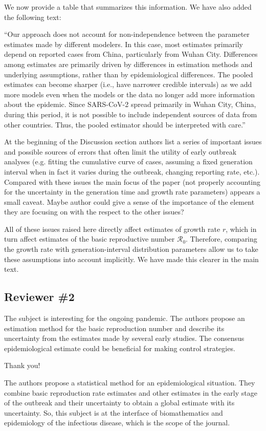 \documentclass[12pt]{article}
\newcommand{\Ro}{\ensuremath{{\mathcal R}_{0}}\xspace}
\newcommand{\rev}{\subsection*}
\newcommand{\revtext}{\textsf}
\begin{document}
We now provide a table that summarizes this information. We have also added the following text:

``Our approach does not account for non-independence between the parameter estimates made by different modelers.
In this case, most estimates primarily depend on reported cases from China, particularly from Wuhan City.
Differences among estimates are primarily driven by differences in estimation methods and underlying assumptions, rather than by epidemiological differences.
The pooled estimates can become sharper (i.e., have narrower credible intervals) as we add more models even when the models or the data no longer add more information about the epidemic.
Since SARS-CoV-2 spread primarily in Wuhan City, China, during this period, it is not possible to include independent sources of data from other countries.
Thus, the pooled estimator should be interpreted with care.''

\revtext{
At the beginning of the Discussion section authors list a series of important issues and possible sources of errors that often limit the utility of early outbreak analyses (e.g. fitting the cumulative curve of cases, assuming a fixed generation interval when in fact it varies during the outbreak, changing reporting rate, etc.). Compared with these issues the main focus of the paper (not properly accounting for the uncertainty in the generation time and growth rate parameters) appears a small caveat. Maybe author could give a sense of the importance of the element they are focusing on with the respect to the other issues?}

All of these issues raised here directly affect estimates of growth rate $r$, which in turn affect estimates of the basic reproductive number \Ro.
Therefore, comparing the growth rate with generation-interval distribution parameters allow us to take these assumptions into account implicitly. We have made this clearer in the main text.

\rev{Reviewer \#2}

\revtext{The subject is interesting for the ongoing pandemic. The authors propose an estimation method
for the basic reproduction number and describe its uncertainty from the estimates made by
several early studies. The consensus epidemiological estimate could be beneficial for making
control strategies.}

Thank you!

\revtext{The authors propose a statistical method for an epidemiological situation. They combine basic
reproduction rate estimates and other estimates in the early stage of the outbreak and their
uncertainty to obtain a global estimate with its uncertainty. So, this subject is at the interface of
biomathematics and epidemiology of the infectious disease, which is the scope of the journal.}
\end{document}
